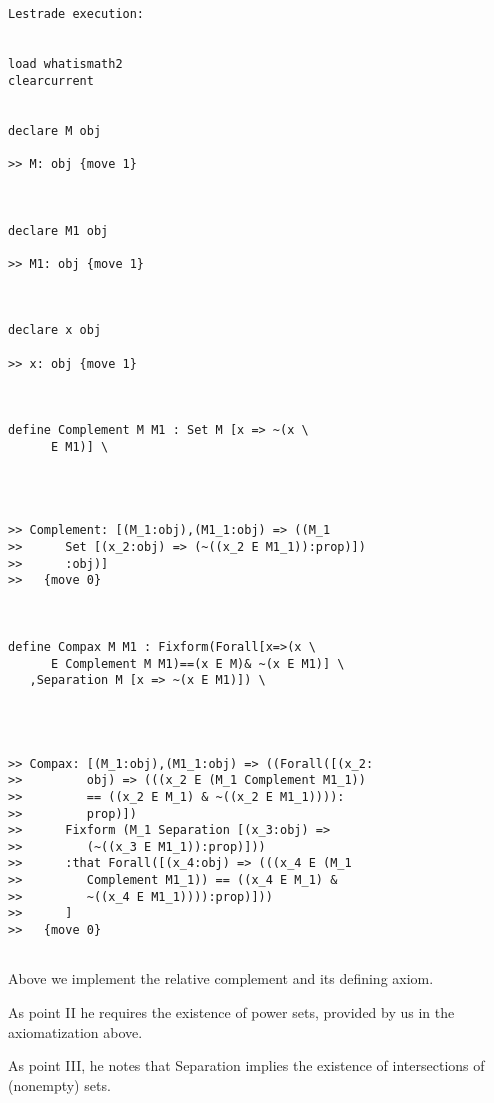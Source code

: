 \documentclass[12pt]{article}
\begin{document}
\begin{verbatim}Lestrade execution:


load whatismath2
clearcurrent


declare M obj

>> M: obj {move 1}



declare M1 obj

>> M1: obj {move 1}



declare x obj

>> x: obj {move 1}



define Complement M M1 : Set M [x => ~(x \
      E M1)] \
   



>> Complement: [(M_1:obj),(M1_1:obj) => ((M_1
>>      Set [(x_2:obj) => (~((x_2 E M1_1)):prop)])
>>      :obj)]
>>   {move 0}



define Compax M M1 : Fixform(Forall[x=>(x \
      E Complement M M1)==(x E M)& ~(x E M1)] \
   ,Separation M [x => ~(x E M1)]) \
   



>> Compax: [(M_1:obj),(M1_1:obj) => ((Forall([(x_2:
>>         obj) => (((x_2 E (M_1 Complement M1_1))
>>         == ((x_2 E M_1) & ~((x_2 E M1_1)))):
>>         prop)])
>>      Fixform (M_1 Separation [(x_3:obj) =>
>>         (~((x_3 E M1_1)):prop)]))
>>      :that Forall([(x_4:obj) => (((x_4 E (M_1
>>         Complement M1_1)) == ((x_4 E M_1) &
>>         ~((x_4 E M1_1)))):prop)]))
>>      ]
>>   {move 0}


\end{verbatim}

Above we implement the relative complement and its defining axiom.

As point II he requires the existence of power sets, provided by us in the axiomatization above. 

As point III, he notes that Separation implies the existence of intersections of (nonempty) sets.
\end{document}
